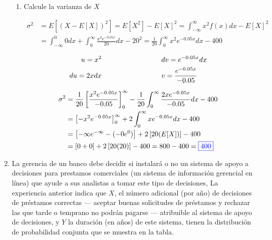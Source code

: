 \documentclass[12pt]{report}
\newcommand{\linejump}{\hfill \break}
\begin{document}
\begin{enumerate}
\begin{enumerate}[label=\alph*.]
    \item Calcule la varianza de $X$
    
    \begin{align*}
      \sigma^2 &= E\left[ \left( X - E[X] \right)^2 \right] = E[X^2] - E[X]^2 = \int_{-\infty}^{\infty} x^2 f(x)dx - E[X]^2 \\
      &= \int_{-\infty}^0 0dx + \int_0^{\infty} \frac{x^2e^{-0.05x}}{20} dx - 20^2 = \frac{1}{20} \int_0^{\infty} x^2e^{-0.05x} dx - 400
    \end{align*}

    \begin{align*}
      u = x^2 \hspace*{3cm} & dv = e^{-0.05x} dx \\
      du = 2xdx \hspace*{3cm} & v = \frac{e^{-0.05x}}{-0.05}
    \end{align*}

    \begin{align*}
      \sigma^2 &= \frac{1}{20} \left[ \frac{x^2e^{-0.05x}}{-0.05} \right]_0^{\infty} - \frac{1}{20} \int_0^{\infty} \frac{2xe^{-0.05x}}{-0.05} dx - 400 \\
      &= \left[ -x^2e^{-0.05x} \right]_0^\infty + 2\int_0^\infty xe^{-0.05x} dx - 400 \\
      &= \left[ -\infty e^{-\infty} - (-0e^0) \right] + 2\left[ 20(E[X]) \right] - 400 \\
      &= \left[ 0 + 0 \right] + 2\left[ 20(20) \right] - 400 = 800 - 400 = {\color{blue}\boxed{400}}
    \end{align*}

  \end{enumerate}

  \linejump
  \item La gerencia de un banco debe decidir si instalará o no un sistema de apoyo a decisiones para prestamos comerciales (un sistema de información gerencial en línea) que ayude a sus analistas a tomar este tipo de decisiones, La experiencia anterior indica que $X$, el número adicional (por año) de decisiones de préstamos correctas — aceptar buenas solicitudes de préstamos y rechazar las que tarde o temprano no podrán pagarse — atribuible al sistema de apoyo de decisiones, y $Y$ la duración (en años) de este sistema, tienen la distribución de probabilidad conjunta que se muestra en la tabla.
  \end{enumerate}
\end{document}
